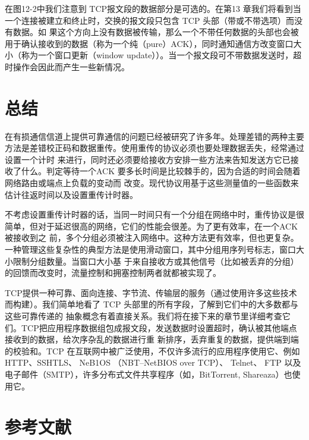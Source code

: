 在图12-2中我们注意到 TCP报文段的数据部分是可选的。在第13 章我们将看到当一个连接被建立和终止时，交换的报文段只包含 TCP 头部（带或不带选项）而没有数据。如
果这个方向上没有数据被传输，那么一个不带任何数据的头部也会被用于确认接收到的数据（称为一个纯（pure）ACK），同时通知通信方改变窗口大小（称为一个窗口更新（window
update））。当一个报文段可不带数据发送时，超时操作会因此而产生一些新情况。
\section{总结}
在有损通信信道上提供可靠通信的问题已经被研究了许多年。处理差错的两种主要方法是差错校正码和数据重传。使用重传的协议必须也要处理数据丢失，经常通过设置一个计时
来进行，同时还必须要给接收方安排一些方法来告知发送方它已接收了什么。判定等待一个ACK 要多长时间是比较棘手的，因为合适的时间会随着网络路由或端点上负载的变动而
改变。现代协议用基于这些测量值的一些函数来估计往返时间以及设置重传计时器。

不考虑设置重传计时器的话，当同一时间只有一个分组在网络中时，重传协议是很简单，但对于延迟很高的网络，它们的性能会很差。为了更有效率，在一个ACK 被接收到之
前，多个分组必须被注入网络中。这种方法更有效率，但也更复杂。一种管理这些复杂性的典型方法是使用滑动窗口，其中分组用序列号标志，窗口大小限制分组数量。当窗口大小基
于来自接收方或其他信号（比如被丢弃的分组）的回馈而改变时，流量控制和拥塞控制两者就都被实现了。

TCP提供一种可靠、面向连接、字节流、传输层的服务（通过使用许多这些技术而构建）。我们简单地看了 TCP 头部里的所有字段，了解到它们中的大多数都与这些可靠传递的
抽象概念有着直接关系。我们将在接下来的章节里详细考查它们。TCP把应用程序数据组包成报文段，发送数据时设置超时，确认被其他端点接收到的数据，给次序杂乱的数据进行重
新排序，丢弃重复的数据，提供端到端的校验和。TCP 在互联网中被广泛使用，不仅许多流行的应用程序使用它、例如 HTTP、SSHTLS、 NeB1OS （NBT--NetBIOS over TCP）、
Telnet、 FTP 以及电子邮件（SMTP），许多分布式文件共享程序（如，BitTorrent, Shareaza）也使用它。
\section{参考文献}

